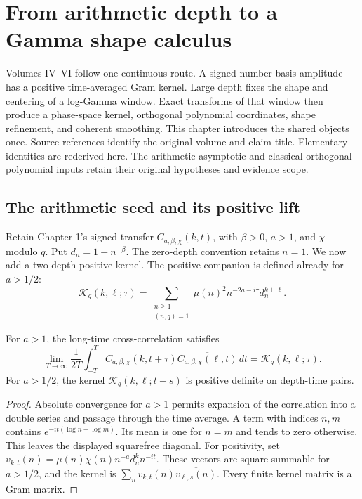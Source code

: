 \chapter{From arithmetic depth to a Gamma shape calculus}
\label{chap:shape-core}

Volumes IV--VI follow one continuous
route. A signed number-basis amplitude has a positive time-averaged Gram
kernel. Large depth fixes the shape and centering of a log-Gamma window. Exact
transforms of that window then produce a phase-space kernel, orthogonal
polynomial coordinates, shape refinement, and coherent smoothing. This chapter
introduces the shared objects once. Source references identify the original
volume and claim title. Elementary identities are rederived here. The
arithmetic asymptotic and classical orthogonal-polynomial inputs retain their
original hypotheses and evidence scope.

\section{The arithmetic seed and its positive lift}

Retain Chapter 1's signed transfer $C_{a,\beta,\chi}(k,t)$, with
$\beta>0$, $a>1$, and $\chi$ modulo $q$. Put $d_n=1-n^{-\beta}$.
The zero-depth convention retains $n=1$. We now add a two-depth positive kernel.
The positive companion is defined already for $a>1/2$:
\[
 \mathcal K_q(k,\ell;\tau)
 =\sum_{\substack{n\geq1\\(n,q)=1}}
 \mu(n)^2 n^{-2a-i\tau}d_n^{k+\ell}.
\]

\begin{proposition}
For $a>1$, the long-time cross-correlation satisfies
\[
 \lim_{T\to\infty}\frac1{2T}\int_{-T}^{T}
 C_{a,\beta,\chi}(k,t+\tau)\overline{C_{a,\beta,\chi}(\ell,t)}\,dt
 =\mathcal K_q(k,\ell;\tau).
\]
For $a>1/2$, the kernel
$\mathcal K_q(k,\ell;t-s)$ is positive definite on depth-time pairs.
\end{proposition}

\begin{proof}
Absolute convergence for $a>1$ permits expansion of the correlation into a
double series and passage through the time average. A term with indices $n,m$
contains $e^{-it(\log n-\log m)}$. Its mean is one for $n=m$ and tends to zero
otherwise. This leaves the displayed squarefree diagonal.
For positivity, set
$v_{k,t}(n)=\mu(n)\chi(n)n^{-a}d_n^k n^{-it}$.
These vectors are square summable for $a>1/2$, and the kernel is
$\sum_n v_{k,t}(n)\overline{v_{\ell,s}(n)}$.
Every finite kernel matrix is a Gram matrix.
\end{proof}

